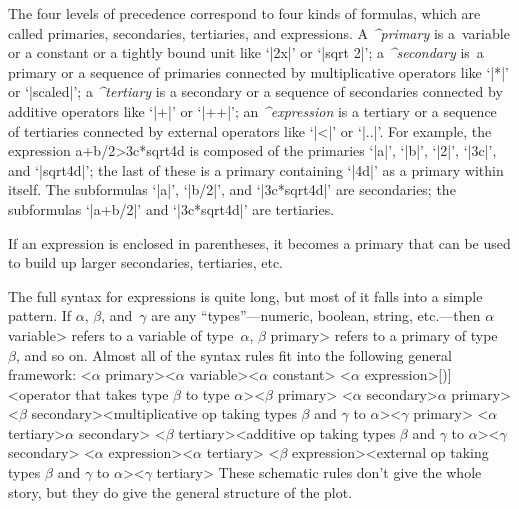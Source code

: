 {{{{\danger The four levels of precedence correspond to four kinds of formulas,
which are called primaries, secondaries, tertiaries, and
expressions. A {\sl^{primary}\/} is a~variable or a constant or a
tightly bound unit like `|2x|' or `|sqrt 2|'; a {\sl^{secondary}\/}
is~a primary or a sequence of primaries connected by multiplicative
operators like `|*|' or `|scaled|'; a {\sl^{tertiary}\/} is a secondary
or a sequence of secondaries connected by additive operators like `|+|'
or `|++|'; an {\sl^{expression}\/} is a tertiary or a sequence of
tertiaries connected by external operators like `|<|' or `|..|'. For example,
the expression
\begintt
a+b/2>3c*sqrt4d
\endtt
is composed of the primaries `|a|', `|b|', `|2|', `|3c|', and `|sqrt4d|';
the last of these is a primary containing `|4d|' as a primary within itself.
The subformulas `|a|', `|b/2|', and `|3c*sqrt4d|' are secondaries; the
subformulas `|a+b/2|' and `|3c*sqrt4d|' are tertiaries.

\danger If an expression is enclosed in parentheses, it becomes a primary
that can be used to build up larger secondaries, tertiaries, etc.

\danger The full syntax for expressions is quite long, but most of it
falls into a simple pattern. If $\alpha$, $\beta$, and~$\gamma$ are
any ``types''---numeric, boolean, string, etc.---then \<$\alpha$ variable>
refers to a variable of type~$\alpha$, \<$\beta$ primary> refers to a
primary of type~$\beta$, and so on. Almost all of the syntax rules fit into
the following general framework:
\beginsyntax
<$\alpha$ primary>\is<$\alpha$ variable>\alt<$\alpha$ constant>%
 \alt[(]<$\alpha$ expression>[)]
 \alt<operator that takes type $\beta$ to type $\alpha$><$\beta$ primary>
<$\alpha$ secondary>\is\<$\alpha$ primary>
 \alt<$\beta$ secondary><multiplicative op taking types $\beta$ and %
 $\gamma$ to $\alpha$><$\gamma$ primary>\kern-1pt
<$\alpha$ tertiary>\is\<$\alpha$ secondary>
 \alt<$\beta$ tertiary><additive op taking types $\beta$ and %
 $\gamma$ to $\alpha$><$\gamma$ secondary>
<$\alpha$ expression>\is<$\alpha$ tertiary>
 \alt<$\beta$ expression><external op taking types $\beta$ and %
 $\gamma$ to $\alpha$><$\gamma$ tertiary>
\endsyntax
These schematic rules don't give the whole story, but they do give the
general structure of the plot.

}}}}
